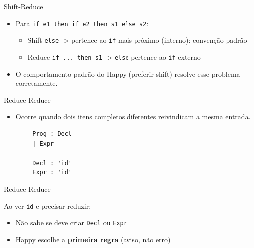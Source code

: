 \begin{frame}[fragile]{Shift-Reduce}

    \begin{itemize}

        \item
        Para \texttt{if e1 then if e2 then s1 else s2}:

        \begin{itemize}

            \item
            Shift \texttt{else} -> pertence ao
            \texttt{if} mais próximo (interno): convenção
            padrão
            \item
            Reduce \texttt{if ... then s1} ->
            \texttt{else} pertence ao
            \texttt{if} externo
        \end{itemize}
        \item
        O comportamento padrão do Happy (preferir shift) resolve esse problema
        corretamente.
    \end{itemize}
\end{frame}

\begin{frame}[fragile]{Reduce-Reduce}

    \begin{itemize}

        \item
        Ocorre quando dois itens completos diferentes reivindicam a mesma
        entrada.
    \end{itemize}

    \begin{lstlisting}
        Prog : Decl
        | Expr

        Decl : 'id'
        Expr : 'id'
    \end{lstlisting}
\end{frame}

\begin{frame}[fragile]{Reduce-Reduce}

    Ao ver \texttt{id} e precisar reduzir:

    \begin{itemize}

        \item
        Não sabe se deve criar \texttt{Decl} ou
        \texttt{Expr}
        \item
        Happy escolhe a \textbf{primeira regra} (aviso, não erro)
    \end{itemize}
\end{frame}

